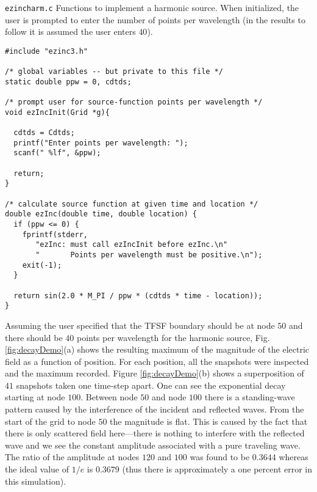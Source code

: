 \begin{program} {\tt ezincharm.c} Functions to implement a harmonic
  source.  When initialized, the user is prompted to enter the number
  of points per wavelength (in the results to follow it is assumed the
  user enters $40$). \label{pro:ezincharm} \codemiddle
\begin{lstlisting}
#include "ezinc3.h"

/* global variables -- but private to this file */
static double ppw = 0, cdtds;

/* prompt user for source-function points per wavelength */
void ezIncInit(Grid *g){

  cdtds = Cdtds;  
  printf("Enter points per wavelength: ");
  scanf(" %lf", &ppw);

  return;
}

/* calculate source function at given time and location */
double ezInc(double time, double location) {
  if (ppw <= 0) {
    fprintf(stderr,
       "ezInc: must call ezIncInit before ezInc.\n"
       "       Points per wavelength must be positive.\n");
    exit(-1);
  }

  return sin(2.0 * M_PI / ppw * (cdtds * time - location));
}
\end{lstlisting}
\end{program}


Assuming the user specified that the TFSF boundary should be at node
$50$ and there should be $40$ points per wavelength for the harmonic
source, Fig. \ref{fig:decayDemo}(a) shows the resulting maximum of the
magnitude of the electric field as a function of position.  For each
position, all the snapshots were inspected and the maximum recorded.
Figure \ref{fig:decayDemo}(b) shows a superposition of $41$ snapshots
taken one time-step apart.  One can see the exponential decay starting
at node $100$.  Between node $50$ and node $100$ there is a
standing-wave pattern caused by the interference of the incident and
reflected waves.  From the start of the grid to node $50$ the
magnitude is flat.  This is caused by the fact that there is only
scattered field here---there is nothing to interfere with the
reflected wave and we see the constant amplitude associated with a
pure traveling wave.  The ratio of the amplitude at nodes $120$ and
$100$ was found to be $0.3644$ whereas the ideal value of $1/e$ is
$0.3679$ (thus there is approximately a one percent error in this
simulation).

